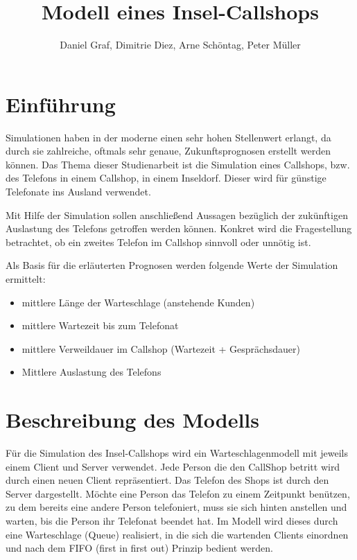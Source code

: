 

\title{Modell eines Insel-Callshops}
\providecommand{\subtitle}[1]{}
\subtitle{2. Projekt zu Modellierung und Simulation}
\author{Daniel Graf, Dimitrie Diez, Arne Schöntag, Peter Müller}
\date{}



\maketitle

\tableofcontents

\section{Einführung}
Simulationen haben in der moderne einen sehr hohen Stellenwert erlangt, da durch sie zahlreiche, oftmals sehr genaue, Zukunftsprognosen erstellt werden können. Das Thema dieser Studienarbeit ist die Simulation eines Callshops, bzw. des Telefons in einem Callshop, in einem Inseldorf. Dieser wird für günstige Telefonate ins Ausland verwendet. 

Mit Hilfe der Simulation sollen anschließend Aussagen bezüglich der zukünftigen Auslastung des Telefons getroffen werden können. Konkret wird die Fragestellung betrachtet, ob ein zweites Telefon im Callshop sinnvoll oder unnötig ist. 

Als Basis für die erläuterten Prognosen werden folgende Werte der Simulation ermittelt:
\begin{itemize}
	\item mittlere Länge der Warteschlage (anstehende Kunden)
	\item mittlere Wartezeit bis zum Telefonat
	\item mittlere Verweildauer im Callshop (Wartezeit + Gesprächsdauer) 
	\item Mittlere Auslastung des Telefons
\end{itemize}

\section{Beschreibung des Modells}
Für die Simulation des Insel-Callshops wird ein Warteschlagenmodell mit jeweils einem Client und Server verwendet. Jede Person die den CallShop betritt wird durch einen neuen Client repräsentiert. Das Telefon des Shops ist durch den Server dargestellt. Möchte eine Person das Telefon zu einem Zeitpunkt benützen, zu dem bereits eine andere Person telefoniert, muss sie sich hinten anstellen und warten, bis die Person ihr Telefonat beendet hat. Im Modell wird dieses durch eine Warteschlage (Queue) realisiert, in die sich die wartenden Clients einordnen und nach dem FIFO (first in first out) Prinzip bedient werden. 

